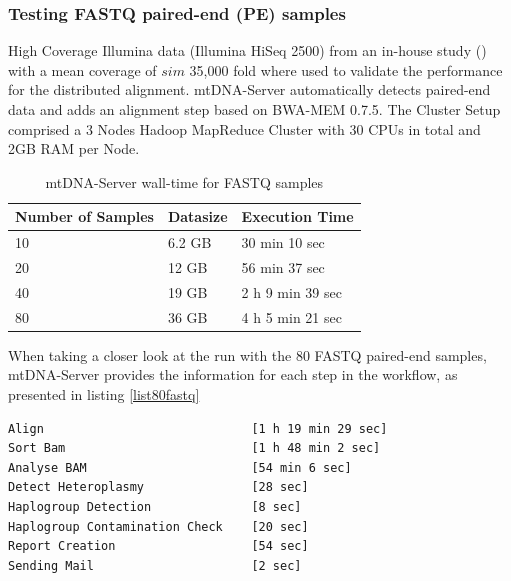 \subsubsection{Testing FASTQ paired-end (PE) samples}
High Coverage Illumina data (Illumina HiSeq 2500) from an in-house study (\cite{Kloss-Brandstatter2015}) with a mean coverage of $sim$ 35,000 fold where used to validate the performance for the distributed alignment.
mtDNA-Server automatically detects paired-end data and adds an alignment step based on BWA-MEM 0.7.5. The Cluster Setup comprised a 3 Nodes Hadoop MapReduce Cluster with 30 CPUs in total and 2GB RAM per Node.
\begin{table}[h]
\centering
\caption{mtDNA-Server wall-time for FASTQ samples}
\label{table:fastq}
\begin{tabular}{lll}
Number of Samples  &  Datasize & Execution Time \\
\hline
10 &   6.2 GB &  30 min 10 sec \\
20 &  12 GB &  56 min 37 sec   \\
40 &  19 GB &  2 h 9 min 39 sec  \\
80 & 36 GB &  4 h 5 min 21 sec   
\end{tabular}
\end{table}

When taking a closer look at the run with the 80 FASTQ paired-end samples, mtDNA-Server provides the information for each step in the workflow, as presented in listing \ref{list80fastq}  

\begin{lstlisting}[caption=Wall time of workflow-steps in analysis of 80 FASTQ samples with mtDNA-Server, label=list80fastq]
Align                             [1 h 19 min 29 sec]
Sort Bam                          [1 h 48 min 2 sec]
Analyse BAM                       [54 min 6 sec]
Detect Heteroplasmy               [28 sec]
Haplogroup Detection              [8 sec]
Haplogroup Contamination Check    [20 sec]
Report Creation                   [54 sec]
Sending Mail                      [2 sec]
\end{lstlisting}

